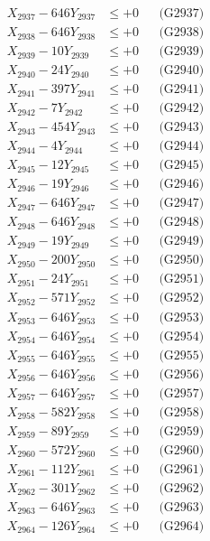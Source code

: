 \documentclass[a4paper,10pt]{article}
\begin{document}
{\begin{align}
X_{2937} - 646Y_{2937} &\leq +0 && \text{(G2937)} \\
X_{2938} - 646Y_{2938} &\leq +0 && \text{(G2938)} \\
X_{2939} - 10Y_{2939} &\leq +0 && \text{(G2939)} \\
X_{2940} - 24Y_{2940} &\leq +0 && \text{(G2940)} \\
\allowbreak
X_{2941} - 397Y_{2941} &\leq +0 && \text{(G2941)} \\
X_{2942} - 7Y_{2942} &\leq +0 && \text{(G2942)} \\
X_{2943} - 454Y_{2943} &\leq +0 && \text{(G2943)} \\
X_{2944} - 4Y_{2944} &\leq +0 && \text{(G2944)} \\
X_{2945} - 12Y_{2945} &\leq +0 && \text{(G2945)} \\
X_{2946} - 19Y_{2946} &\leq +0 && \text{(G2946)} \\
X_{2947} - 646Y_{2947} &\leq +0 && \text{(G2947)} \\
X_{2948} - 646Y_{2948} &\leq +0 && \text{(G2948)} \\
X_{2949} - 19Y_{2949} &\leq +0 && \text{(G2949)} \\
X_{2950} - 200Y_{2950} &\leq +0 && \text{(G2950)} \\
\allowbreak
X_{2951} - 24Y_{2951} &\leq +0 && \text{(G2951)} \\
X_{2952} - 571Y_{2952} &\leq +0 && \text{(G2952)} \\
X_{2953} - 646Y_{2953} &\leq +0 && \text{(G2953)} \\
X_{2954} - 646Y_{2954} &\leq +0 && \text{(G2954)} \\
X_{2955} - 646Y_{2955} &\leq +0 && \text{(G2955)} \\
X_{2956} - 646Y_{2956} &\leq +0 && \text{(G2956)} \\
X_{2957} - 646Y_{2957} &\leq +0 && \text{(G2957)} \\
X_{2958} - 582Y_{2958} &\leq +0 && \text{(G2958)} \\
X_{2959} - 89Y_{2959} &\leq +0 && \text{(G2959)} \\
X_{2960} - 572Y_{2960} &\leq +0 && \text{(G2960)} \\
\allowbreak
X_{2961} - 112Y_{2961} &\leq +0 && \text{(G2961)} \\
X_{2962} - 301Y_{2962} &\leq +0 && \text{(G2962)} \\
X_{2963} - 646Y_{2963} &\leq +0 && \text{(G2963)} \\
X_{2964} - 126Y_{2964} &\leq +0 && \text{(G2964)} \\

\end{align}}
\end{document}
